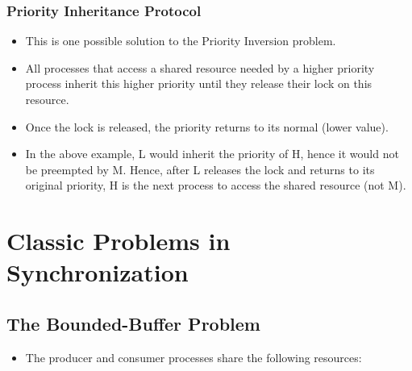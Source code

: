 \documentclass{article}
\theoremstyle{plain}
\theoremstyle{definition}
\begin{document}
\subsubsection{Priority Inheritance Protocol}
\begin{itemize}
    \item This is one possible solution to the Priority Inversion problem.
    
    \item All processes that access a shared resource needed by a higher priority process inherit this higher priority until they release their lock on this resource.
    
    \item Once the lock is released, the priority returns to its normal (lower value).
    
    \item In the above example, L would inherit the priority of H, hence it would not be preempted by M. Hence, after L releases the lock and returns to its original priority, H is the next process to access the shared resource (not M). 
\end{itemize}


\section{Classic Problems in Synchronization}
\subsection{The Bounded-Buffer Problem}

\begin{itemize}
    \item The producer and consumer processes share the following resources:
\end{itemize}
\end{document}
